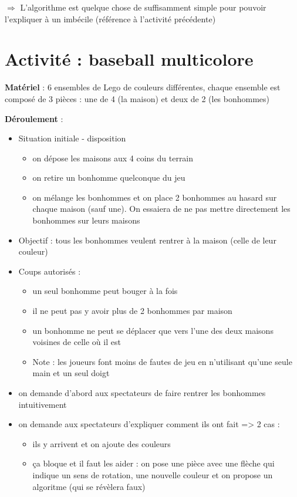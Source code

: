 \documentclass{article}
\newcommand{\titre}[1]{\medskip\noindent\textbf{#1} : }
\newcommand{\materiel}{\titre{Matériel}}
\newcommand{\deroulement}{\titre{Déroulement}}
\begin{document}
$\Rightarrow$ L'algorithme est quelque chose de suffisamment simple pour
pouvoir l'expliquer à un imbécile (référence à l'activité précédente)



\section{Activité : baseball multicolore}
\materiel 6 ensembles de Lego de couleurs différentes, chaque ensemble est composé de 3 pièces : une de 4 (la maison) et deux de 2 (les bonhommes)

\deroulement
\begin{itemize}
\item Situation initiale - disposition 
\begin{itemize}
\item on dépose les maisons aux 4 coins du terrain
\item on retire un bonhomme quelconque du jeu
\item on mélange les bonhommes et on place 2 bonhommes au hasard sur chaque maison (sauf une). On essaiera de ne pas mettre directement les bonhommes sur leurs maisons
\end{itemize}
\item Objectif : tous les bonhommes veulent rentrer à la maison (celle de leur couleur)
\item Coups autorisés :
\begin{itemize}
\item un seul bonhomme peut bouger à la fois
\item il ne peut pas y avoir plus de 2 bonhommes par maison
\item un bonhomme ne peut se déplacer que vers l'une des deux maisons voisines de celle où il est
\item Note : les joueurs font moins de fautes de jeu en n'utilisant qu'une seule main et un seul doigt
\end{itemize}
\item on demande d'abord aux spectateurs de faire rentrer les bonhommes intuitivement
\item on demande aux spectateurs d'expliquer comment ils ont fait => 2 cas : 
\begin{itemize}
\item ils y arrivent et on ajoute des couleurs
\item ça bloque et il faut les aider : on pose une pièce avec une flèche qui indique un sens de rotation, une nouvelle couleur et on propose un algoritme (qui se révèlera faux)

\end{itemize}
\end{itemize}
\end{document}
